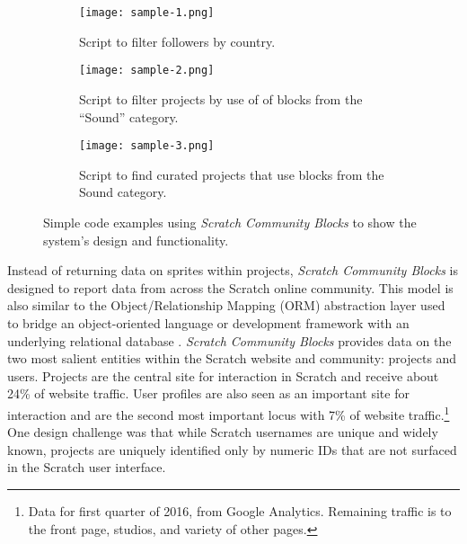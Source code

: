 \documentclass{sigchi}
\begin{document}
\begin{figure*}[ht]
    \centering
    \begin{subfigure}[t]{0.32\textwidth}
        \centering
        \texttt{[image: sample-1.png]}
        \caption{Script to filter followers by country.}
        \label{fig:sample-1}
    \end{subfigure}
    \hfill
    \begin{subfigure}[t]{0.32\textwidth}
        \centering
        \texttt{[image: sample-2.png]}
        \caption{Script to filter projects by use of of blocks from the ``Sound'' category.}
        \label{fig:sample-2}
    \end{subfigure}
    \hfill
    \begin{subfigure}[t]{0.32\textwidth}
        \centering
        \texttt{[image: sample-3.png]}
        \caption{Script to find curated projects that use blocks from the Sound category.}%
        \label{fig:sample-3}
    \end{subfigure}
    \caption{Simple code examples using \emph{Scratch Community Blocks} to show the system's design and functionality.}
    \label{fig:samples}
\end{figure*}


Instead of returning data on sprites within projects, \emph{Scratch Community Blocks} is designed to report data from across the Scratch online community. This model is also similar to the Object/Relationship Mapping (ORM) abstraction layer used to bridge an object-oriented language or development framework with an underlying relational database \cite{ambler_mapping_2000}. \emph{Scratch Community Blocks} provides data on the two most salient entities within the Scratch website and community: projects and users. Projects are the central site for interaction in Scratch and receive about 24\% of website traffic. User profiles are also seen as an important site for interaction and are the second most important locus with 7\% of website traffic.\footnote{Data for first quarter of 2016, from Google Analytics. Remaining traffic is to the front page, studios, and variety of other pages.} One design challenge was that while Scratch usernames are unique and widely known, projects are uniquely identified only by numeric IDs that are not surfaced in the Scratch user interface.
\end{document}
